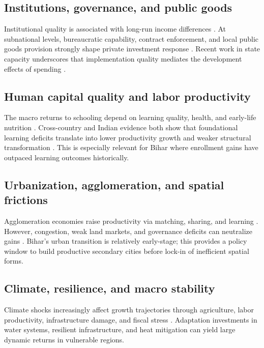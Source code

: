 \documentclass[preprint,12pt]{elsarticle}
\begin{document}
\subsection{Institutions, governance, and public goods}
Institutional quality is associated with long-run income differences \citep{acemoglu2001,north1990}. At subnational levels, bureaucratic capability, contract enforcement, and local public goods provision strongly shape private investment response \citep{besley2012,khemani2017}. Recent work in state capacity underscores that implementation quality mediates the development effects of spending \citep{andrews2017,pritchett2018}.

\subsection{Human capital quality and labor productivity}
The macro returns to schooling depend on learning quality, health, and early-life nutrition \citep{hanushek2012,heckman2006}. Cross-country and Indian evidence both show that foundational learning deficits translate into lower productivity growth and weaker structural transformation \citep{asercentre2023,worldbank2018learning}. This is especially relevant for Bihar where enrollment gains have outpaced learning outcomes historically.

\subsection{Urbanization, agglomeration, and spatial frictions}
Agglomeration economies raise productivity via matching, sharing, and learning \citep{glaeser2010,duranton2004}. However, congestion, weak land markets, and governance deficits can neutralize gains \citep{henderson2010}. Bihar's urban transition is relatively early-stage; this provides a policy window to build productive secondary cities before lock-in of inefficient spatial forms.

\subsection{Climate, resilience, and macro stability}
Climate shocks increasingly affect growth trajectories through agriculture, labor productivity, infrastructure damage, and fiscal stress \citep{nordhaus1991,dell2012,burke2015}. Adaptation investments in water systems, resilient infrastructure, and heat mitigation can yield large dynamic returns in vulnerable regions.
\end{document}
